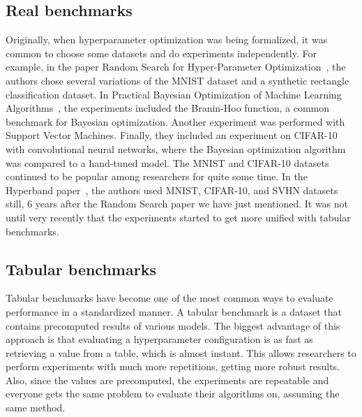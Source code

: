 \subsection{Real benchmarks}
Originally, when hyperparameter optimization was being formalized, it was common to choose some datasets and do experiments independently. For example, in the paper Random Search for Hyper-Parameter Optimization~\cite{bergstra2012random}, the authors chose several variations of the MNIST dataset and a synthetic rectangle classification dataset. In Practical Bayesian Optimization of Machine Learning Algorithms~\cite{snoek2012practical}, the experiments included the Branin-Hoo function, a common benchmark for Bayesian optimization. Another experiment was performed with Support Vector Machines. Finally, they included an experiment on CIFAR-10 with convolutional neural networks, where the Bayesian optimization algorithm was compared to a hand-tuned model. The MNIST and CIFAR-10 datasets continued to be popular among researchers for quite some time. In the Hyperband paper~\cite{li2018hyperband}, the authors used MNIST, CIFAR-10, and SVHN datasets still, 6 years after the Random Search paper we have just mentioned. It was not until very recently that the experiments started to get more unified with tabular benchmarks.

\subsection{Tabular benchmarks}


Tabular benchmarks have become one of the most common ways to evaluate performance in a standardized manner. A tabular benchmark is a dataset that contains precomputed results of various models. The biggest advantage of this approach is that evaluating a hyperparameter configuration is as fast as retrieving a value from a table, which is almost instant. This allows researchers to perform experiments with much more repetitions, getting more robust results. Also, since the values are precomputed, the experiments are repeatable and everyone gets the same problem to evaluate their algorithms on, assuming the same method.

